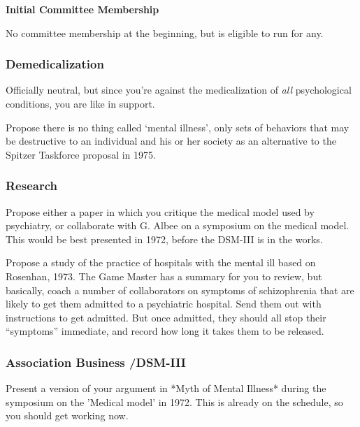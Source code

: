\begin{refsection}
\textbf{Initial Committee Membership}

No committee membership at the beginning, but is eligible to run for any.

\subsubsection{Demedicalization}
\label{demedicalization}

Officially neutral, but since you’re against the medicalization of \emph{all} psychological conditions, you are like in support.
\begin{proposal}[Szasz]\label{proposal:szasz}Propose there is no thing called ‘mental illness’, only sets of behaviors that may be destructive to an individual and his or her society as an alternative to the Spitzer Taskforce proposal in 1975.\end{proposal}

\subsubsection{Research}
\label{research}

\begin{researchtask}[Szasz]\label{researchtask:szasz}
Propose either a paper in which you critique the medical model used by psychiatry, or collaborate with G. Albee on a symposium on the medical model. This would be best presented in 1972, before the DSM-III is in the works. 
\end{researchtask}

Propose a study of the practice of hospitals with the mental ill based on Rosenhan, 1973. The Game Master has a summary for you to review, but basically, coach a number of collaborators on symptoms of schizophrenia that are likely to get them admitted to a psychiatric hospital. Send them out with instructions to get admitted. But once admitted, they should all stop their ``symptoms'' immediate, and record how long it takes them to be released.

\subsubsection{Association Business \slash  DSM-III}
\label{associationbusinessdsm-iii}

\begin{writingtask}[Szasz]\label{writingtask:szasz}
Present a version of your argument in *Myth of Mental Illness* during the symposium on the 'Medical model' in 1972. This is already on the schedule, so you should get working now. 
\end{writingtask}


\end{refsection}
